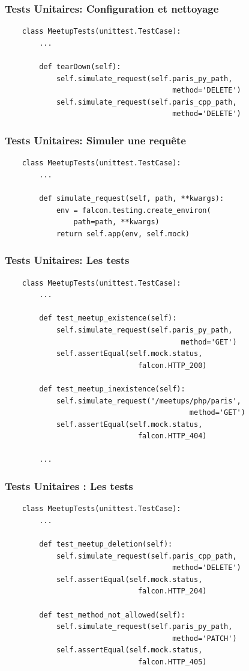 \documentclass[10pt, compress]{beamer}
\begin{document}
\begin{frame}[fragile]
	\frametitle{Tests Unitaires: Configuration et nettoyage}
    
    \begin{verbatim}
    class MeetupTests(unittest.TestCase):
        ...
        
        def tearDown(self):
            self.simulate_request(self.paris_py_path,
            						   method='DELETE')
            self.simulate_request(self.paris_cpp_path,
            						   method='DELETE')
    \end{verbatim}
\end{frame}
\begin{frame}[fragile]
	\frametitle{Tests Unitaires: Simuler une requête}
    
    \begin{verbatim}
    class MeetupTests(unittest.TestCase):
        ...
        
        def simulate_request(self, path, **kwargs):
            env = falcon.testing.create_environ(
                path=path, **kwargs)
            return self.app(env, self.mock)
    \end{verbatim}
\end{frame}
\begin{frame}[fragile]
	\frametitle{Tests Unitaires: Les tests}
    
    \begin{verbatim}
   	class MeetupTests(unittest.TestCase):
        ...
        
        def test_meetup_existence(self):
            self.simulate_request(self.paris_py_path,
            							 method='GET')
            self.assertEqual(self.mock.status, 
            				   falcon.HTTP_200)
        
        def test_meetup_inexistence(self):
            self.simulate_request('/meetups/php/paris',
            							   method='GET')
            self.assertEqual(self.mock.status,
             				   falcon.HTTP_404)
        
        ...
    \end{verbatim}
\end{frame}
\begin{frame}[fragile]
	\frametitle{Tests Unitaires : Les tests}
    
    \begin{verbatim}
    class MeetupTests(unittest.TestCase):
    	...
        
        def test_meetup_deletion(self):
            self.simulate_request(self.paris_cpp_path,
            						   method='DELETE')
            self.assertEqual(self.mock.status,
            				   falcon.HTTP_204)
        
        def test_method_not_allowed(self):
            self.simulate_request(self.paris_py_path,
            						   method='PATCH')
            self.assertEqual(self.mock.status, 
            				   falcon.HTTP_405)
    \end{verbatim}
\end{frame}
\end{document}
